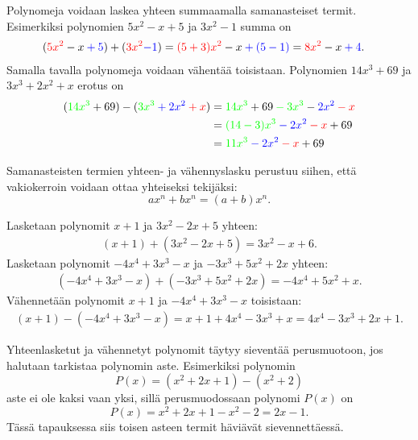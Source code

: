 
Polynomeja voidaan laskea yhteen summaamalla samanasteiset termit. Esimerkiksi polynomien $5x^2-x+5$ ja $3x^2-1$ summa on
   \begin{align*}
        (\textcolor{red}{5x^2}-x\textcolor{blue}{{}+5})+(\textcolor{red}{3x^2}\textcolor{blue}{-1}) &=\textcolor{red}{(5+3)x^2}-x\textcolor{blue}{{}+(5-1)}=\textcolor{red}{8x^2}-x\textcolor{blue}{{}+4}.
    \end{align*}
Samalla tavalla polynomeja voidaan vähentää toisistaan. Polynomien
$14x^3+69$ ja $3x^3+2x^2+x$ erotus on
    \begin{align*}
        (\textcolor{green}{14x^3} + 69) - (\textcolor{green}{3x^3} \textcolor{blue}{{}+ 2x^2} \textcolor{red}{{}+x})
        &= \textcolor{green}{14x^3} + 69 \textcolor{green}{{}-3x^3} - 
            \textcolor{blue}{2x^2} \textcolor{red}{{}-x} \\
        &= \textcolor{green}{(14-3)x^3} \textcolor{blue}{{}-2x^2} \textcolor{red}{{}-x} + 69 \\
        &= \textcolor{green}{11x^3} \textcolor{blue}{{}-2x^2} \textcolor{red}{{}-x} + 69
    \end{align*}
    
Samanasteisten termien yhteen- ja vähennyslasku perustuu siihen, että vakiokerroin voidaan
ottaa yhteiseksi tekijäksi:
\[
ax^n+bx^n=(a+b)x^n.
\]
    
\begin{esimerkki}
Lasketaan polynomit
$x+1$ ja $3x^2-2x+5$ yhteen:
   \begin{align*}
        (x+1)+(3x^2-2x+5) =3x^2-x+6.
    \end{align*}
Lasketaan polynomit $-4x^4+3x^3-x$ ja $-3x^3+5x^2+2x$ yhteen:
   \begin{align*}
        (-4x^4+3x^3-x)+(-3x^3+5x^2+2x) =-4x^4+5x^2+x.
    \end{align*}
Vähennetään polynomit $x+1$ ja $-4x^4+3x^3-x$ toisistaan:
   \begin{align*}
        (x+1)-(-4x^4+3x^3-x) =x+1+4x^4-3x^3+x=4x^4-3x^3+2x+1.
    \end{align*}
\end{esimerkki}


Yhteenlasketut ja vähennetyt polynomit täytyy sieventää perusmuotoon, jos halutaan tarkistaa polynomin aste.
Esimerkiksi polynomin
\[
P(x)=(x^2+2x+1)-(x^2+2)
\]
aste ei ole kaksi vaan yksi, sillä perusmuodossaan polynomi $P(x)$ on
\[
P(x)=x^2+2x+1-x^2-2=2x-1.
\]
Tässä tapauksessa siis toisen asteen termit häviävät sievennettäessä.